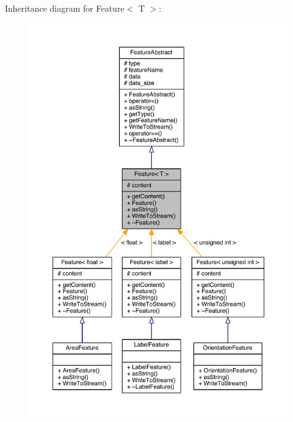 Inheritance diagram for Feature$<$ T $>$\+:
\nopagebreak
\begin{figure}[H]
\begin{center}
\leavevmode
\includegraphics[width=350pt]{class_feature__inherit__graph}
\end{center}
\end{figure}


